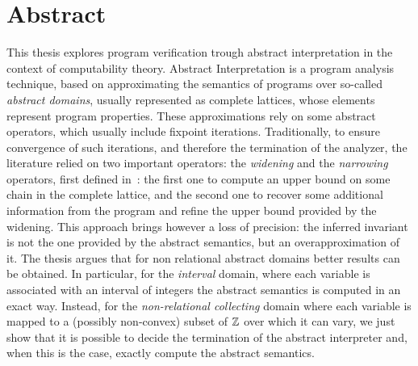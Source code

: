 \begingroup

\chapter*{Abstract}
This thesis explores program verification trough abstract
interpretation in the context of computability theory. Abstract
Interpretation is a program analysis technique, based on approximating
the semantics of programs over so-called \emph{abstract domains},
usually represented as complete lattices, whose elements represent
program properties. These approximations rely on some abstract
operators, which usually include fixpoint iterations. Traditionally,
to ensure convergence of such iterations, and therefore the
termination of the analyzer, the literature relied on two important
operators: the \emph{widening} and the \emph{narrowing} operators,
first defined in~\cite{patrickradhia:one}: the first one to compute an
upper bound on some chain in the complete lattice, and the second one
to recover some additional information from the program and refine the
upper bound provided by the widening. This approach brings however a
loss of precision: the inferred invariant is not the one provided by
the abstract semantics, but an overapproximation of it. The thesis
argues that for non relational abstract domains better results can be
obtained. In particular, for the \emph{interval} domain, where each
variable is associated with an interval of integers the abstract
semantics is computed in an exact way. Instead, for the
\emph{non-relational collecting} domain where each variable is mapped
to a (possibly non-convex) subset of \(\mathbb{Z}\) over which it can vary, we
just show that it is possible to decide the termination of the
abstract interpreter and, when this is the case, exactly compute the
abstract semantics.

\endgroup

\vfill
